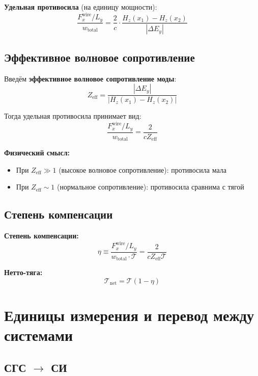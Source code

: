 \documentclass[a4paper,12pt]{article}
\begin{document}
\textbf{Удельная противосила} (на единицу мощности):
\begin{equation}
\boxed{
\frac{F_x^{\text{wire}}/L_y}{w_{\text{total}}} = \frac{2}{c} \cdot \frac{H_z(x_1) - H_z(x_2)}{|\Delta E_y|}
}
\end{equation}

\subsection{Эффективное волновое сопротивление}

Введём \textbf{эффективное волновое сопротивление моды}:
\begin{equation}
\boxed{
Z_{\text{eff}} = \frac{|\Delta E_y|}{|H_z(x_1) - H_z(x_2)|}
}
\end{equation}

Тогда удельная противосила принимает вид:
\begin{equation}
\frac{F_x^{\text{wire}}/L_y}{w_{\text{total}}} = \frac{2}{c Z_{\text{eff}}}
\end{equation}

\textbf{Физический смысл:}
\begin{itemize}
    \item При $Z_{\text{eff}} \gg 1$ (высокое волновое сопротивление): противосила мала
    \item При $Z_{\text{eff}} \sim 1$ (нормальное сопротивление): противосила сравнима с тягой
\end{itemize}

\subsection{Степень компенсации}

\textbf{Степень компенсации:}
\begin{equation}
\boxed{
\eta \equiv \frac{F_x^{\text{wire}}/L_y}{w_{\text{total}} \cdot \mathcal{T}} = \frac{2}{c Z_{\text{eff}} \mathcal{T}}
}
\end{equation}

\textbf{Нетто-тяга:}
\begin{equation}
\mathcal{T}_{\text{net}} = \mathcal{T} (1 - \eta)
\end{equation}

\section{Единицы измерения и перевод между системами}

\subsection{СГС $\rightarrow$ СИ}
\end{document}
